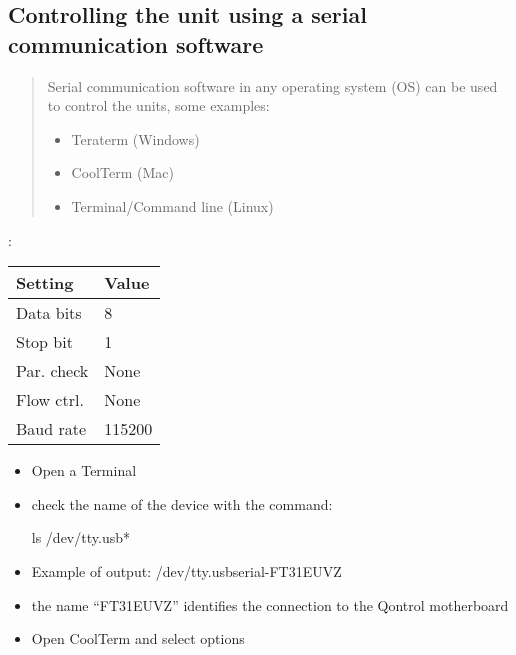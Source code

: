\documentclass[letterpaper,10pt,english]{sphinxmanual}
\begin{document}
\subsection{Controlling the unit using a serial communication software}
\label{\detokenize{guide/getting_started:controlling-the-unit-using-a-serial-communication-software}}\begin{quote}

Serial communication software in any operating system (OS) can be used to control the units, some examples:
\begin{itemize}
\item {} 
Teraterm (Windows)

\item {} 
CoolTerm (Mac)

\item {} 
Terminal/Command line (Linux)

\end{itemize}
\end{quote}


 :


\begin{savenotes}\sphinxattablestart
\centering
\begin{tabulary}{\linewidth}[t]{|T|T|}
\hline
\sphinxstyletheadfamily 
Setting
&\sphinxstyletheadfamily 
Value
\\
\hline
Data bits
&
8
\\
\hline
Stop bit
&
1
\\
\hline
Par. check
&
None
\\
\hline
Flow ctrl.
&
None
\\
\hline
Baud rate
&
115200
\\
\hline
\end{tabulary}
\par
\sphinxattableend\end{savenotes}


\begin{itemize}
\item {} 
Open a Terminal

\item {} 
check the name of the device with the command:

ls /dev/tty.usb*

\item {} 
Example of output:
/dev/tty.usbserial-FT31EUVZ

\item {} 
the name “FT31EUVZ” identifies the connection to the Qontrol motherboard

\item {} 
Open CoolTerm and select options

\end{itemize}
\end{document}
